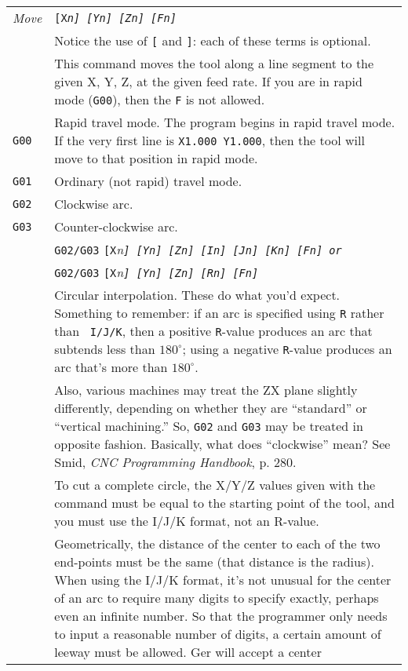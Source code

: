 \documentclass[titlepage,oneside,10pt]{article}
\begin{document}
\vskip 0.25cm
\begin{longtable}{lp{10cm}}
\em{Move} & \tt{[X}\em{n}\tt{]} \tt{[Y}\em{n}\tt{]}
\tt{[Z}\em{n}\tt{]} \tt{[F}\em{n}\tt{]} \\ 
& Notice the use of {\tt [} and {\tt ]}: each of these terms is
optional. \\
& This command moves the tool along a line segment to the given X, Y,
Z, at the given feed rate. If you are in rapid mode ({\tt G00}), then
the {\tt F} is not allowed.\\
{\tt G00}&Rapid travel mode. The program begins in rapid travel
mode. If the very first line is {\tt X1.000 Y1.000}, then the tool
will move to that position in rapid mode.\\
{\tt G01}&Ordinary (not rapid) travel mode.\\
{\tt G02}& Clockwise arc.\\
{\tt G03}&Counter-clockwise arc. \\
& {\tt G02/G03} {\tt [X}\em{n}\tt{]} \tt{[Y}\em{n}\tt{]}
\tt{[Z}\em{n}\tt{]} {\tt [I}\em{n}\tt{]} \tt{[J}\em{n}\tt{]}
\tt{[K}\em{n}\tt{]} \tt{[F}\em{n}{\tt ]} \emph{or} \\
&{\tt G02/G03} {\tt [X}\em{n}\tt{]} \tt{[Y}\em{n}\tt{]} \tt{[Z}\em{n}\tt{]}
\tt{[R}\em{n}\tt{]} \tt{[F}\em{n}\tt{]}\\
&Circular interpolation. These do what you'd expect. Something to
remember: if an arc is specified using {\tt R} rather than {\tt
  I/J/K}, then a positive {\tt R}-value produces an arc that subtends
less than $180^\circ$; using a negative {\tt R}-value produces an arc
that's more than $180^\circ$.\\
&Also, various machines may treat the ZX plane slightly
differently, depending on whether they are ``standard'' or ``vertical
machining.'' So, {\tt G02} and {\tt G03} may be treated in opposite
fashion. Basically, what does ``clockwise'' mean? See Smid, \emph{CNC
  Programming Handbook}, p. 280.\\
&To cut a complete circle, the X/Y/Z values given with the command
must be equal to the starting point of the tool, and you must use
the I/J/K format, not an R-value.\\
&Geometrically, the distance of the center to each of the two
end-points must be the same (that distance is the radius). When using
the I/J/K format, it's not unusual for the center of an arc to require
many digits to specify exactly, perhaps even an infinite number. So
that the programmer only needs to input a reasonable number of digits,
a certain amount of leeway must be allowed. Ger will accept a center

\end{longtable}
\end{document}
